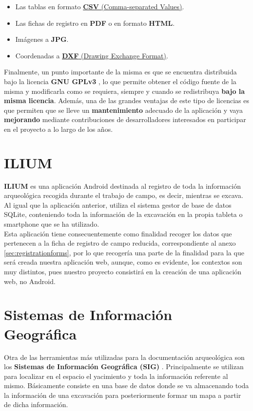     \begin{itemize}
        \item Las tablas en formato \href{https://dev.socrata.com/docs/formats/csv.html}
        {\textbf{CSV} (Comma-separated Values)}.
        \item Las fichas de registro en \textbf{PDF} o en formato \textbf{HTML}.
        \item Imágenes a \textbf{JPG}.
        \item Coordenadas a \href{https://docs.fileformat.com/cad/dxf/}
        {\textbf{DXF} (Drawing Exchange Format)}.
    \end{itemize}

Finalmente, un punto importante de la misma es que se encuentra distribuida bajo la
licencia \textbf{GNU GPLv3} \cite{gplv3}, lo que permite obtener el código fuente de
la misma y modificarla como se requiera, siempre y cuando se redistribuya \textbf{bajo la
misma licencia}. Además, una de las grandes ventajas de este tipo de licencias es que
permiten que se lleve un \textbf{mantenimiento} adecuado de la aplicación y vaya
\textbf{mejorando} mediante contribuciones de desarrolladores interesados en participar en
el proyecto a lo largo de los años. \\


\section{ILIUM}
\textbf{ILIUM} \cite{ilium} es una aplicación Android destinada al registro de toda la
información arqueológica recogida durante el trabajo de campo, es decir, mientras se
excava. Al igual que la aplicación anterior, utiliza el sistema gestor de base de datos
SQLite, conteniendo toda la información de la excavación en la propia tableta o smartphone
que se ha utilizado.\\

Esta aplicación tiene consecuentemente como finalidad recoger los datos que pertenecen a
la ficha de registro de campo reducida, correspondiente al anexo \ref{sec:registrationforms},
por lo que recogería una parte de la finalidad para la que será creada nuestra aplicación web,
aunque, como es evidente, los contextos son muy distintos, pues nuestro proyecto consistirá
en la creación de una aplicación web, no Android. \\


\section{Sistemas de Información Geográfica}
Otra de las herramientas más utilizadas para la documentación arqueológica son los
\textbf{Sistemas de Información Geográfica (SIG)} \cite{gis}. Principalmente se utilizan
para localizar en el espacio el yacimiento y toda la información referente al mismo.
Básicamente consiste en una base de datos donde se va almacenando toda la información de una
excavación para posteriormente formar un mapa a partir de dicha información. \\


